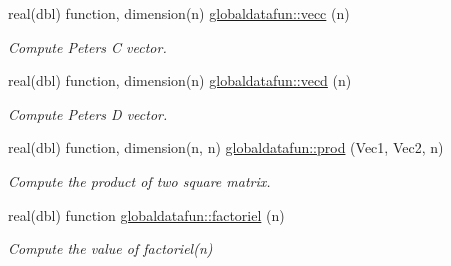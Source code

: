 \begin{DoxyCompactItemize}
real(dbl) function, dimension(n) \hyperlink{namespaceglobaldatafun_ac274536794b3306528c0130a20080b15}{globaldatafun\+::vecc} (n)
\begin{DoxyCompactList}\small\item\em Compute Peters C vector. \end{DoxyCompactList}\item 
real(dbl) function, dimension(n) \hyperlink{namespaceglobaldatafun_a71653a1d825c3dee70490c228d23b738}{globaldatafun\+::vecd} (n)
\begin{DoxyCompactList}\small\item\em Compute Peters D vector. \end{DoxyCompactList}\item 
real(dbl) function, dimension(n, n) \hyperlink{namespaceglobaldatafun_afe68f9e5d61e5e7844a0a4b225bb3825}{globaldatafun\+::prod} (Vec1, Vec2, n)
\begin{DoxyCompactList}\small\item\em Compute the product of two square matrix. \end{DoxyCompactList}\item 
real(dbl) function \hyperlink{namespaceglobaldatafun_a0ae214f4b91d5705b4d0107913efe369}{globaldatafun\+::factoriel} (n)
\begin{DoxyCompactList}\small\item\em Compute the value of factoriel(n) \end{DoxyCompactList}\end{DoxyCompactItemize}
